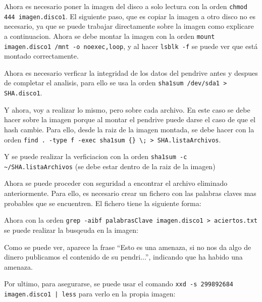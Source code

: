 \documentclass{article}
\begin{document}
Ahora es necesario poner la imagen del disco a solo lectura con la orden \verb|chmod 444 imagen.disco1|. El siguiente paso, que es copiar la imagen a otro disco no es necesario, ya que se puede trabajar directamente sobre la imagen como explicare a continuacion. Ahora se debe montar la imagen con la orden \verb|mount imagen.disco1 /mnt -o noexec,loop|, y al hacer \verb|lsblk -f| se puede ver que está montado correctamente.


Ahora es necesario verficar la integridad de los datos del pendrive antes y despues de completar el analisis, para ello se usa la orden \verb|sha1sum /dev/sda1 > SHA.disco1|.


Y ahora, voy a realizar lo mismo, pero sobre cada archivo. En este caso se debe hacer sobre la imagen porque al montar el pendrive puede darse el caso de que el hash cambie. Para ello, desde la raiz de la imagen montada, se debe hacer con la orden \verb|find . -type f -exec sha1sum {} \; > SHA.listaArchivos|.


Y se puede realizar la verficiacion con la orden \verb|sha1sum -c ~/SHA.listaArchivos| (se debe estar dentro de la raiz de la imagen)


Ahora se puede proceder con seguridad a encontrar el archivo eliminado anteriormente. Para ello, es necesario crear un fichero con las palabras claves mas probables que se encuentren. El fichero tiene la siguiente forma:


Ahora con la orden \verb|grep -aibf palabrasClave imagen.disco1 > aciertos.txt| se puede realizar la busqeuda en la imagen:

Como se puede ver, aparece la frase ``Esto es una amenaza, si no nos da algo de dinero publicamos el contenido de su pendri...'', indicando que ha habido una amenaza.

Por ultimo, para asegurarse, se puede usar el comando \texttt{xxd -s 299892684 imagen.disco1 | less} para verlo en la propia imagen:
\end{document}
